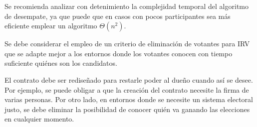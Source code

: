 \begin{recomendations}
    Se recomienda analizar con detenimiento la complejidad temporal del algoritmo de desempate, ya que puede que en casos con pocos participantes sea m\'as eficiente emplear un algoritmo $\Theta(n^2)$. 
    
    Se debe considerar el empleo de un criterio de eliminaci\'on de votantes para IRV que se adapte mejor a los entornos donde los votantes conocen con tiempo suficiente qui\'enes son los candidatos.

    El contrato debe ser redise\~nado para restarle poder al due\~no cuando as\'i se desee. Por ejemplo, se puede obligar a que la creaci\'on del contrato  necesite la firma de varias personas. Por otro lado, en  entornos donde se necesite un sistema electoral justo, se debe eliminar la posibilidad de conocer qui\'en va ganando las elecciones en cualquier momento. 
\end{recomendations}
